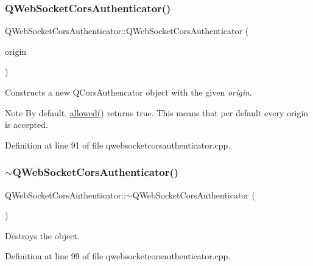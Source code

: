 \subsubsection{\texorpdfstring{Q\+Web\+Socket\+Cors\+Authenticator()}{QWebSocketCorsAuthenticator()}\hspace{0.1cm}{\footnotesize\ttfamily [1/2]}}
{\footnotesize\ttfamily Q\+Web\+Socket\+Cors\+Authenticator\+::\+Q\+Web\+Socket\+Cors\+Authenticator (\begin{DoxyParamCaption}\item[{const Q\+String \&}]{origin }\end{DoxyParamCaption})\hspace{0.3cm}{\ttfamily [explicit]}}

Constructs a new Q\+Cors\+Authencator object with the given {\itshape origin}. \begin{DoxyNote}{Note}
By default, \mbox{\hyperlink{class_q_web_socket_cors_authenticator_a2ffc01ec9c913f4d78aa34d44f1c69fb}{allowed()}} returns true. This means that per default every origin is accepted. 
\end{DoxyNote}


Definition at line 91 of file qwebsocketcorsauthenticator.\+cpp.

\mbox{\label{class_q_web_socket_cors_authenticator_a9faaeee4cc6f23f30c49c300095f6095}} 
\subsubsection{\texorpdfstring{$\sim$\+Q\+Web\+Socket\+Cors\+Authenticator()}{~QWebSocketCorsAuthenticator()}}
{\footnotesize\ttfamily Q\+Web\+Socket\+Cors\+Authenticator\+::$\sim$\+Q\+Web\+Socket\+Cors\+Authenticator (\begin{DoxyParamCaption}{ }\end{DoxyParamCaption})}

Destroys the object. 

Definition at line 99 of file qwebsocketcorsauthenticator.\+cpp.

\mbox{\label{class_q_web_socket_cors_authenticator_a3955589b5ff50150df93eae9b21c012b}} 
